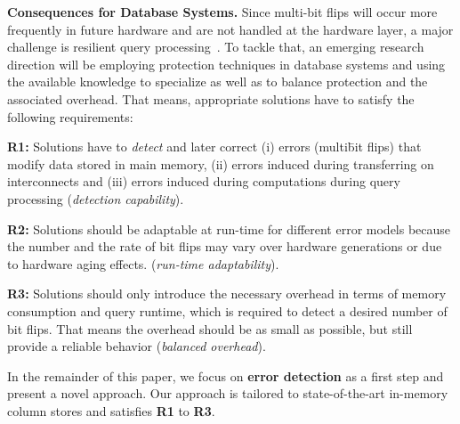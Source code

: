 \textbf{Consequences for Database Systems.}
Since multi-bit flips will occur more frequently in future hardware and are not handled at the hardware layer, a major challenge is resilient query processing~\cite{DBLP:journals/pvldb/BohmLF11}. To tackle that, an emerging research direction will be employing protection techniques in database systems and using the available knowledge to specialize as well as to balance protection and the associated overhead. That means, appropriate solutions have to satisfy the following requirements:  
\begin{compactenum}
\item[\textbf{R1:}] Solutions have to \emph{detect} and later correct (i) errors (multi\=bit flips) that modify data stored in main memory, (ii) errors induced during transferring on interconnects and (iii) errors induced during computations during query processing (\emph{detection capability}).
\item[\textbf{R2:}] Solutions should be adaptable at run-time for different error models because the number and the rate of bit flips may vary over hardware generations or due to hardware aging effects. (\emph{run-time adaptability}).
\item[\textbf{R3:}] Solutions should only introduce the necessary overhead in terms of memory consumption and query runtime, which is required to detect a desired number of bit flips. That means the overhead should be as small as possible, but still provide a reliable behavior (\emph{balanced overhead}). 
\end{compactenum}
In the remainder of this paper, we focus on \textbf{error detection} as a first step and present a novel approach. Our approach is tailored to state-of-the-art in-memory column stores and satisfies \textbf{R1} to \textbf{R3}. %
